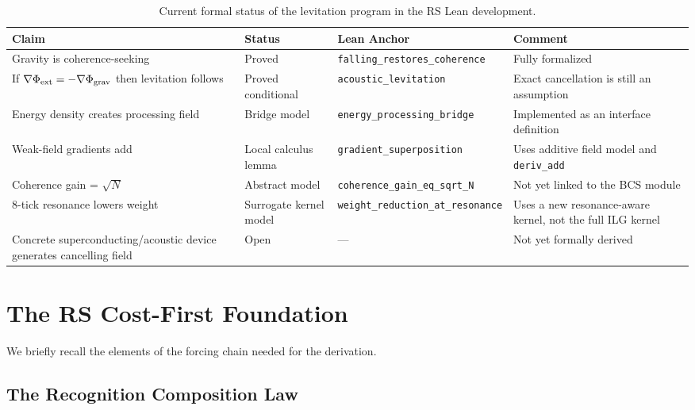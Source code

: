 \documentclass[11pt,a4paper]{article}
\newcommand{\lean}[1]{\texttt{\small #1}}
\begin{document}
\begin{table}[ht]
\centering
\begin{tabular}{@{}p{}p{}p{}p{}@{}}
\toprule
\textbf{Claim} & \textbf{Status} & \textbf{Lean Anchor} & \textbf{Comment} \\
\midrule
Gravity is coherence-seeking & Proved & \lean{falling\_restores\_coherence} & Fully formalized \\
If $\nabla\Phi_{\rm ext} = -\nabla\Phi_{\rm grav}$ then levitation follows & Proved conditional & \lean{acoustic\_levitation} & Exact cancellation is still an assumption \\
Energy density creates processing field & Bridge model & \lean{energy\_processing\_bridge} & Implemented as an interface definition \\
Weak-field gradients add & Local calculus lemma & \lean{gradient\_superposition} & Uses additive field model and \lean{deriv\_add} \\
Coherence gain = $\sqrt{N}$ & Abstract model & \lean{coherence\_gain\_eq\_sqrt\_N} & Not yet linked to the BCS module \\
8-tick resonance lowers weight & Surrogate kernel model & \lean{weight\_reduction\_at\_resonance} & Uses a new resonance-aware kernel, not the full ILG kernel \\
Concrete superconducting/acoustic device generates cancelling field & Open & --- & Not yet formally derived \\
\bottomrule
\end{tabular}
\caption{Current formal status of the levitation program in the RS Lean development.}
\label{tab:status}
\end{table}

\section{The RS Cost-First Foundation}
\label{sec:foundation}

We briefly recall the elements of the forcing chain needed for the derivation.

\subsection{The Recognition Composition Law}
\end{document}
